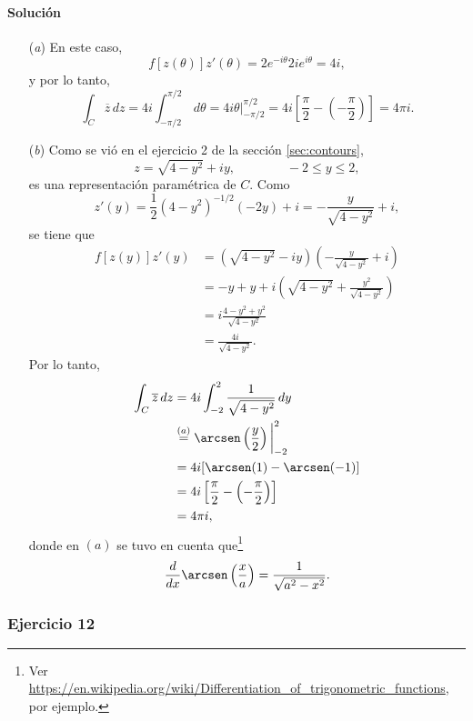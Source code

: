 \documentclass[a4paper]{report}
\begin{document}
\paragraph{Solución} 
\begin{enumerate}
 \item[(\textit{a})] En este caso,
 \[
  f[z(\theta)]z'(\theta)=2e^{-i\theta}2ie^{i\theta}=4i,
 \]
 y por lo tanto,
 \[
  \int_C\overline{z}\,dz=4i\int_{-\pi/2}^{\pi/2}\,d\theta=4i\theta\bigg|_{-\pi/2}^{\pi/2}
  =4i\left[\frac{\pi}{2}-\left(-\frac{\pi}{2}\right)\right]=4\pi i.
 \]
 \item[(\textit{b})] Como se vió en el ejercicio 2 de la sección \ref{sec:contours},
 \[
  z=\sqrt{4-y^2}+iy,
  \qquad\qquad-2\leq y\leq2,
 \]
 es una representación paramétrica de \(C\). Como
 \[
  z'(y)=\frac{1}{2}(4-y^2)^{-1/2}(-2y)+i=-\frac{y}{\sqrt{4-y^2}}+i,
 \]
 se tiene que 
 \begin{align*}
  f[z(y)]z'(y)&=\left(\sqrt{4-y^2}-iy\right)\left(-\frac{y}{\sqrt{4-y^2}}+i\right)\\
    &=-y+y+i\left(\sqrt{4-y^2}+\frac{y^2}{\sqrt{4-y^2}}\right)\\
    &=i\frac{4-y^2+y^2}{\sqrt{4-y^2}}\\
    &=\frac{4i}{\sqrt{4-y^2}}.
 \end{align*}
 Por lo tanto,
 \begin{align*}
  \int_C\overline{z}\,dz&=4i\int_{-2}^2\frac{1}{\sqrt{4-y^2}}\,dy\\
   &\overset{(a)}{=}\arcsen\left(\frac{y}{2}\right)\bigg|_{-2}^2\\
   &=4i[\arcsen(1)-\arcsen(-1)]\\
   &=4i\left[\frac{\pi}{2}-\left(-\frac{\pi}{2}\right)\right]\\
   &=4\pi i,
 \end{align*}
donde en \((a)\) se tuvo en cuenta que\footnote{Ver \url{https://en.wikipedia.org/wiki/Differentiation_of_trigonometric_functions}, por ejemplo.} 
\[
 \frac{d}{dx}\arcsen\left(\frac{x}{a}\right)=\frac{1}{\sqrt{a^2-x^2}}.
\]
\end{enumerate}

\subsubsection{Ejercicio 12}
\end{document}
